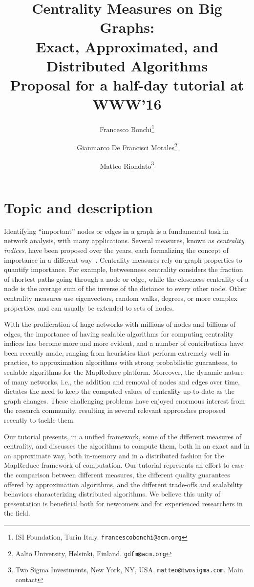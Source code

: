 \documentclass[11pt]{article}
\title{Centrality Measures on Big Graphs:\\Exact, Approximated, and Distributed
Algorithms \\ {\small Proposal for a half-day tutorial at WWW'16}}
\author{
	Francesco Bonchi\footnote{ISI Foundation, Turin Italy.
	\texttt{francescobonchi@acm.org}} \and Gianmarco De
	Francisci Morales\footnote{Aalto University, Helsinki, Finland.
	\texttt{gdfm@acm.org}} \and Matteo
	Riondato\footnote{Two Sigma Investments, New York, NY, USA.
	\texttt{matteo@twosigma.com}. Main contact}
}
\date{}
\begin{document}
\maketitle

\section*{Topic and description}
Identifying ``important'' nodes or edges in a graph is a fundamental task
in network analysis, with many applications. Several measures, known as
\emph{centrality indices}, have been proposed over the years, each formalizing the
concept of importance in a different way~\citep{Newman10}. Centrality measures
rely on graph properties to quantify importance. For example, betweenness
centrality considers the fraction of shortest paths going through a
node or edge, while the closeness centrality of a node is the average sum of the inverse
of the distance to every other node. Other centrality measures use eigenvectors,
random walks, degrees, or more complex properties, and can usually be extended to sets of nodes.

With the proliferation of huge networks with millions of nodes and billions of
edges, the importance of having scalable algorithms for computing centrality
indices has become more and more evident, and a number of contributions have been
recently made, ranging from heuristics that perform extremely well in
practice, to approximation algorithms with strong probabilistic guarantees,
to scalable algorithms for the MapReduce platform. Moreover, the dynamic nature
of many networks, i.e., the addition and removal of nodes and edges over
time, dictates the need to keep the computed values of centrality up-to-date as
the graph changes. These challenging problems have enjoyed enormous interest
from the research community, resulting in several relevant approaches proposed recently
to tackle them.

Our tutorial presents, in a unified framework, some of the different measures of
centrality, and discusses the algorithms to compute them, both in an exact and in
an approximate way, both in-memory and in a distributed fashion for the
MapReduce framework of computation. Our tutorial represents an effort to ease the
comparison between different measures, the different quality guarantees offered
by approximation algorithms, and the different trade-offs and scalability
behaviors characterizing distributed algorithms. We believe this unity
of presentation is beneficial both for newcomers and for experienced researchers
in the field.
\end{document}
